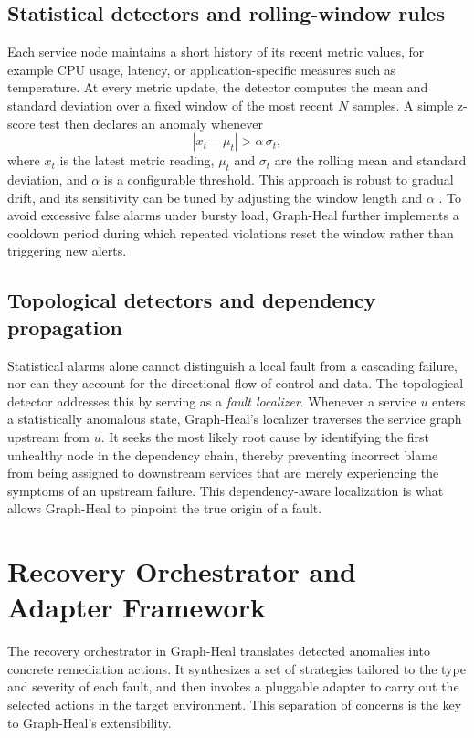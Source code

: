 \documentclass[11pt,conference]{IEEEtran}
\begin{document}
\subsection{Statistical detectors and rolling-window rules}
Each service node maintains a short history of its recent metric values, for example CPU usage, latency, or application-specific measures such as temperature.  At every metric update, the detector computes the mean and standard deviation over a fixed window of the most recent \(N\) samples.  A simple z-score test then declares an anomaly whenever
\[
  |x_t - \mu_t| > \alpha\,\sigma_t,
\]
where \(x_t\) is the latest metric reading, \(\mu_t\) and \(\sigma_t\) are the rolling mean and standard deviation, and \(\alpha\) is a configurable threshold.  This approach is robust to gradual drift, and its sensitivity can be tuned by adjusting the window length and \(\alpha\) \cite{chandola2009anomaly}.  To avoid excessive false alarms under bursty load, Graph-Heal further implements a cooldown period during which repeated violations reset the window rather than triggering new alerts.

\subsection{Topological detectors and dependency propagation}
Statistical alarms alone cannot distinguish a local fault from a cascading failure, nor can they account for the directional flow of control and data.  The topological detector addresses this by serving as a \emph{fault localizer}. Whenever a service \(u\) enters a statistically anomalous state, Graph-Heal's localizer traverses the service graph upstream from \(u\). It seeks the most likely root cause by identifying the first unhealthy node in the dependency chain, thereby preventing incorrect blame from being assigned to downstream services that are merely experiencing the symptoms of an upstream failure. This dependency-aware localization is what allows Graph-Heal to pinpoint the true origin of a fault.


\section{Recovery Orchestrator and Adapter Framework}
\label{sec:recovery-orchestrator}

The recovery orchestrator in Graph-Heal translates detected anomalies into concrete remediation actions. It synthesizes a set of strategies tailored to the type and severity of each fault, and then invokes a pluggable adapter to carry out the selected actions in the target environment. This separation of concerns is the key to Graph-Heal's extensibility.
\end{document}
